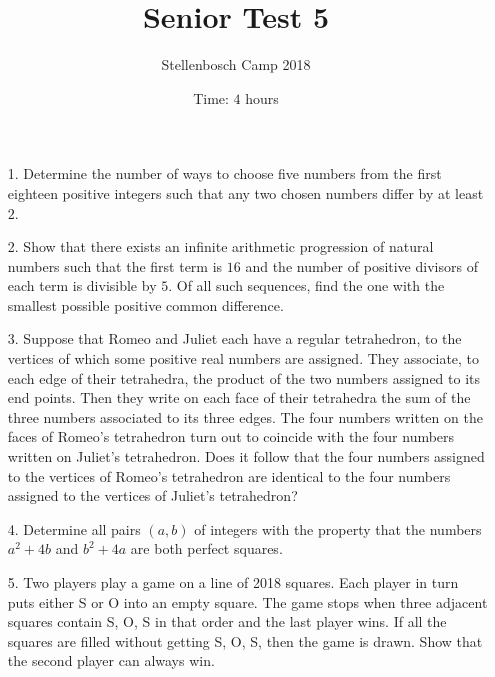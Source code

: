 \documentclass[a4paper, 12pt]{article}
\title{Senior Test 5}
\author{Stellenbosch Camp 2018}
\date{Time: $4$ hours}
\begin{document}
 \maketitle

\begin{enumerate}

\item[1.] Determine the number of ways to choose five numbers from the first eighteen positive integers such that any two chosen numbers differ by at least $2$.


\vspace{6pt}

\item[2.]  Show that there exists an infinite arithmetic progression of natural numbers such that the first term is $16$ and the number of positive divisors of each term is divisible by $5$. Of all such sequences, find the one with the smallest possible positive common difference.


\vspace{6pt}
\item[3.]      Suppose that Romeo and Juliet each have a regular tetrahedron, to the vertices of which some positive real numbers are assigned. They associate, to each edge of their tetrahedra, the product of the two numbers assigned to its end points. Then they write on each face of their tetrahedra the sum of the three numbers associated to its three edges. The four numbers written on the faces of Romeo’s tetrahedron turn out to coincide with the four numbers written on Juliet’s tetrahedron. Does it follow that the four numbers assigned to the vertices of Romeo’s tetrahedron are identical to the four numbers assigned to the vertices of Juliet’s tetrahedron?


\vspace{6pt}

\item[4.] Determine all pairs $(a,b)$ of integers with the property that the numbers $a^2+4b$ and $b^2+4a$ are both perfect squares.


\vspace{6pt}

\item[5.]   Two players play a game on a line of 2018 squares. Each player in turn puts either S or O into an empty square. The game stops when three adjacent squares contain S, O, S in that order and the last player wins. If all the squares are filled without getting S, O, S, then the game is drawn. Show that the second player can always win.



\end{enumerate}
\end{document}
